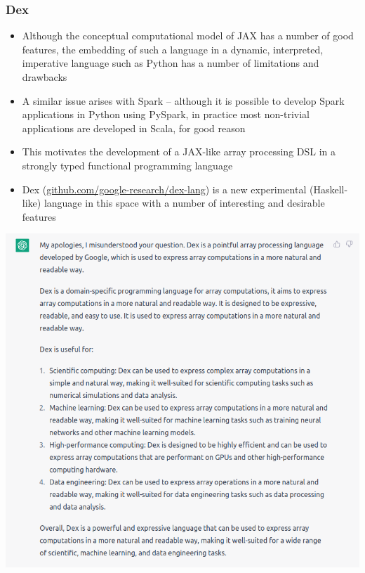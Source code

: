 \documentclass[mathserif,handout]{beamer}
\begin{document}
\begin{frame}
  \frametitle{Dex}
  \begin{itemize}
  \item Although the conceptual computational model of JAX has a number of good features, the embedding of such a language in a dynamic, interpreted, imperative language such as Python has a number of limitations and drawbacks
  \item A similar issue arises with Spark -- although it is possible to develop Spark applications in Python using PySpark, in practice most non-trivial applications are developed in Scala, for good reason
  \item This motivates the development of a JAX-like array processing DSL in a strongly typed functional programming language
    \item \alert{Dex} (\url{github.com/google-research/dex-lang}) is a new experimental (Haskell-like) language in this space with a number of interesting and desirable features
  \end{itemize}
\end{frame}

\begin{frame}
\centerline{\includegraphics[height=0.95\textheight]{cgpt5}}
\end{frame}
\end{document}
